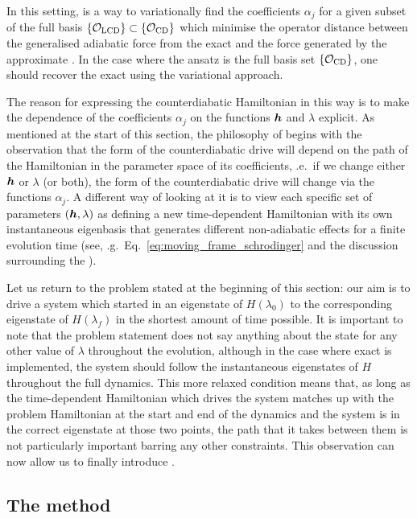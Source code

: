In this setting,  is a way to variationally find the coefficients $\alpha_j$ for a given subset of the full  basis $\{\mathcal{O}_{\rm LCD}\} \subset \{\mathcal{O}_{\rm CD}\}$ which minimise the operator distance between the generalised adiabatic force from the exact  and the force generated by the approximate . In the case where the ansatz is the full basis set $\{\mathcal{O}_{\rm CD}\}$, one should recover the exact  using the variational approach.

The reason for expressing the counterdiabatic Hamiltonian in this way is to make the dependence of the coefficients $\alpha_j$ on the functions $\boldsymbol{h}$ and $\lambda$ explicit. As mentioned at the start of this section, the philosophy of  begins with the observation that the form of the counterdiabatic drive will depend on the path of the Hamiltonian in the parameter space of its coefficients, \@i.e.~if we change either $\boldsymbol{h}$ or $\lambda$ (or both), the form of the counterdiabatic drive will change via the functions $\alpha_j$. A different way of looking at it is to view each specific set of parameters $(\boldsymbol{h}, \lambda)$ as defining a new time-dependent Hamiltonian with its own instantaneous eigenbasis that generates different non-adiabatic effects for a finite evolution time (see, \@e.g.~Eq.~\eqref{eq:moving_frame_schrodinger} and the discussion surrounding the ).

Let us return to the problem stated at the beginning of this section: our aim is to drive a system which started in an eigenstate of $H(\lambda_0)$ to the corresponding eigenstate of $H(\lambda_f)$ in the shortest amount of time possible. It is important to note that the problem statement does not say anything about the state for any other value of $\lambda$ throughout the evolution, although in the case where exact  is implemented, the system should follow the instantaneous eigenstates of $H$ throughout the full dynamics. This more relaxed condition means that, as long as the time-dependent Hamiltonian which drives the system matches up with the problem Hamiltonian at the start and end of the dynamics and the system is in the correct eigenstate at those two points, the path that it takes between them is not particularly important barring any other constraints. This observation can now allow us to finally introduce .

\subsection{The method}

